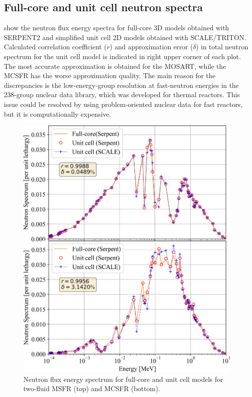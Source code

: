 \documentclass{anstrans}
\begin{document}
\subsection{Full-core and unit cell neutron spectra} 
\label{sec:spectrum}
 show the neutron flux energy spectra for full-core 3D models obtained with SERPENT2 and simplified unit cell 2D models obtained with SCALE/TRITON. Calculated correlation coefficient ($r$) and approximation error ($\delta$) in total neutron spectrum for the unit cell model is indicated in right upper corner of each plot. The most accurate approximation is obtained for the \gls{MOSART}, while the \gls{MCSFR} has the worse approximation quality. The main reason for the discrepancies is the low-energy-group resolution at fast-neutron energies in the 238-group nuclear data library, which was developed for thermal reactors. This issue could be resolved by using problem-oriented nuclear data for fast reactors, but it is computationally expensive. 
\begin{figure}[!htb]
  \centering
  \includegraphics[scale=0.545]{./Figures/two_full_vs_unit_spectrum.png}
      \vspace{-0.2in}
  \caption{Neutron flux energy spectrum for full-core and unit cell models for two-fluid \gls{MSFR} (top) and \gls{MCSFR} (bottom).}   
  \label{fig:spectrum_two}
\end{figure}
\end{document}
